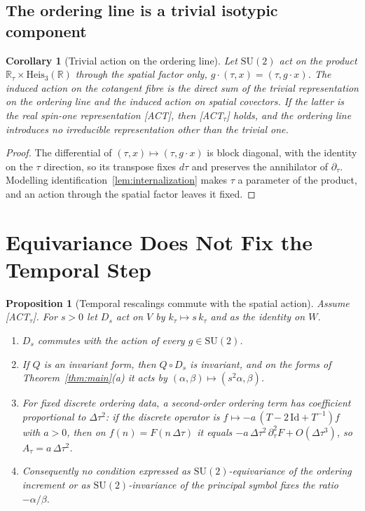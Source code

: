 \documentclass[12pt,a4paper]{article}
\newtheorem{corollary}[theorem]{Corollary}
\newtheorem{proposition}[theorem]{Proposition}
\newcommand{\Heis}{\mathrm{Heis}}
\newcommand{\SU}{\mathrm{SU}}
\newcommand{\Rtau}{\mathbb{R}_\tau}
\begin{document}
    \subsection{The ordering line is a trivial isotypic component}

      \begin{corollary}[Trivial action on the ordering line]
        \label{cor:no-new-rep}
        Let $\SU(2)$ act on the product $\Rtau\times\Heis_3(\mathbb{R})$ through the spatial factor only,
        $g\cdot(\tau, x) = (\tau, g\cdot x)$.
        The induced action on the cotangent fibre is the direct sum of the trivial representation on the ordering
        line and the induced action on spatial covectors.
        If the latter is the real spin-one representation \textup{[ACT]}, then \textup{[ACT$_\tau$]} holds, and the
        ordering line introduces no irreducible representation other than the trivial one.
      \end{corollary}

      \begin{proof}
        The differential of $(\tau, x)\mapsto(\tau, g\cdot x)$ is block diagonal, with the identity on the $\tau$
        direction, so its transpose fixes $d\tau$ and preserves the annihilator of $\partial_\tau$.
        Modelling identification~\ref{lem:internalization} makes $\tau$ a parameter of the product, and an action
        through the spatial factor leaves it fixed.
      \end{proof}

  \section{Equivariance Does Not Fix the Temporal Step}
    \label{sec:equivariance}

    \begin{proposition}[Temporal rescalings commute with the spatial action]
      \label{prop:equivariance}
      Assume \textup{[ACT$_\tau$]}.
      For $s>0$ let $D_s$ act on $V$ by $k_\tau\mapsto s\,k_\tau$ and as the identity on $W$.
      \begin{enumerate}
        \item[(a)] $D_s$ commutes with the action of every $g\in\SU(2)$.
        \item[(b)] If $Q$ is an invariant form, then $Q\circ D_s$ is invariant, and on the forms of
        Theorem~\ref{thm:main}\textup{(a)} it acts by $(\alpha,\beta)\mapsto(s^2\alpha,\beta)$.
        \item[(c)] For fixed discrete ordering data, a second-order ordering term has coefficient proportional to
        $\Delta\tau^2$: if the discrete operator is $f\mapsto -a\,(T - 2\,\mathrm{Id} + T^{-1})f$ with $a>0$, then
        on $f(n) = F(n\,\Delta\tau)$ it equals $-a\,\Delta\tau^2\,\partial_\tau^2 F + O(\Delta\tau^3)$, so
        $A_\tau = a\,\Delta\tau^2$.
        \item[(d)] Consequently no condition expressed as $\SU(2)$-equivariance of the ordering increment or as
        $\SU(2)$-invariance of the principal symbol fixes the ratio $-\alpha/\beta$.
      \end{enumerate}
    \end{proposition}
\end{document}
